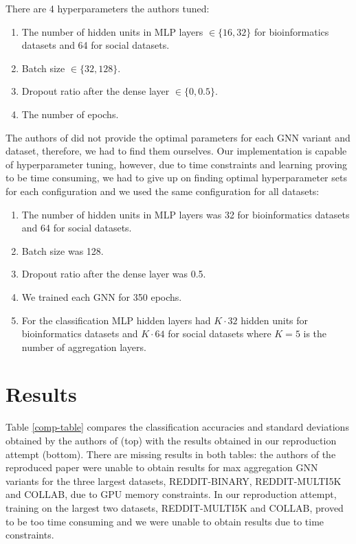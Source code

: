 \documentclass{article} %
\begin{document}
There are 4 hyperparameters the authors tuned:
\begin{enumerate}
    \item The number of hidden units in MLP layers $\in \{16, 32\}$ for bioinformatics datasets and 64 for social datasets.
    \item Batch size $\in \{32, 128\}$.
    \item Dropout ratio after the dense layer $\in \{0, 0.5\}$.
    \item The number of epochs.
\end{enumerate}
The authors of \cite{ThePaper} did not provide the optimal parameters for each GNN variant and dataset, therefore, we had to find them ourselves. Our implementation is capable of hyperparameter tuning, however, due to time constraints and learning proving to be time consuming, we had to give up on finding optimal hyperparameter sets for each configuration and we used the same configuration for all datasets:
\begin{enumerate}
    \item The number of hidden units in MLP layers was 32 for bioinformatics datasets and 64 for social datasets.
    \item Batch size was 128.
    \item Dropout ratio after the dense layer was 0.5.
    \item We trained each GNN for 350 epochs.
    \item For the classification MLP hidden layers had $K \cdot 32$ hidden units for bioinformatics datasets and $K \cdot 64$ for social datasets where $K = 5$ is the number of aggregation layers.
\end{enumerate}

\section{Results}
Table \ref{comp-table} compares the classification accuracies and standard deviations obtained by the authors of \cite{ThePaper} (top) with the results obtained in our reproduction attempt (bottom). There are missing results in both tables: the authors of the reproduced paper were unable to obtain results for max aggregation GNN variants for the three largest datasets, REDDIT-BINARY, REDDIT-MULTI5K and COLLAB, due to GPU memory constraints. In our reproduction attempt, training on the largest two datasets, REDDIT-MULTI5K and COLLAB, proved to be too time consuming and we were unable to obtain results due to time constraints. 
\end{document}
